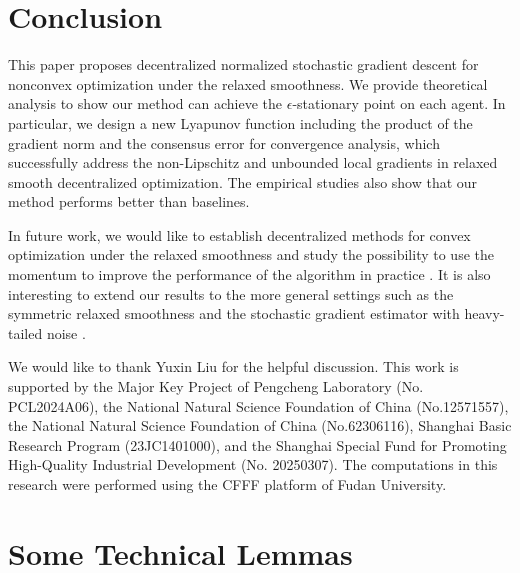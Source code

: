 \documentclass[sigconf]{acmart}
\theoremstyle{plain}
\begin{document}
\section{Conclusion}

This paper proposes decentralized normalized stochastic gradient
descent for nonconvex optimization under the relaxed smoothness. 
We provide theoretical analysis to show our method can achieve the $\epsilon$-stationary point on each agent.
In particular, we design a new Lyapunov function including the product of the gradient norm and the consensus error for convergence analysis, which successfully address the non-Lipschitz and unbounded local gradients in relaxed smooth decentralized optimization.
The empirical studies also show that our method performs better than baselines.

In future work, we would like to establish decentralized methods for convex optimization under the relaxed smoothness \citep{chezhegov2025convergence,gaash2025convergence,gorbunov2024methods,koloskova2023revisiting,lobanov2024linear,vankov2024optimizing} and study the possibility to use the momentum to improve the performance of the algorithm in practice \cite{cutkosky2020momentum}.
It is also interesting to extend our results to the more general settings such as the symmetric relaxed smoothness \citep{chen2023generalized} and the stochastic gradient estimator with heavy-tailed noise \citep{liu2024nonconvex}.

\begin{acks}
We would like to thank Yuxin Liu for the helpful discussion. 
This work is supported by the Major Key Project of Pengcheng Laboratory (No. PCL2024A06), the National Natural Science Foundation of China (No.12571557), the National Natural Science Foundation of China (No.62306116), Shanghai Basic Research Program (23JC1401000), and the Shanghai Special Fund for Promoting High-Quality Industrial Development (No. 20250307).
The computations in this research were performed using the CFFF platform of Fudan University.
\end{acks}






\clearpage
\appendix

\section{Some Technical Lemmas}
\end{document}
